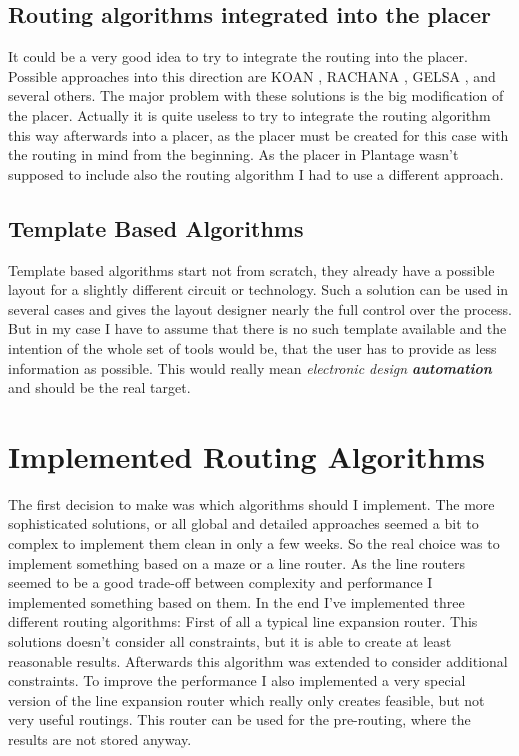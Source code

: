 \subsection{Routing algorithms integrated into the placer}
It could be a very good idea to try to integrate the routing into the placer. Possible approaches into this direction are KOAN \cite[page 178]{springer:eda_analog_routing}, RACHANA \cite[page 178]{springer:eda_analog_routing}, GELSA \cite[page 179]{springer:eda_analog_routing}, and several others. The major problem with these solutions is the big modification of the placer. Actually it is quite useless to try to integrate the routing algorithm this way afterwards into a placer, as the placer must be created for this case with the routing in mind from the beginning. As the placer in Plantage wasn't supposed to include also the routing algorithm I had to use a different approach.

\subsection{Template Based Algorithms}
Template based algorithms start not from scratch, they already have a possible layout for a slightly different circuit or technology. Such a solution can be used in several cases and gives the layout designer nearly the full control over the process. But in my case I have to assume that there is no such template available and the intention of the whole set of tools would be, that the user has to provide as less information as possible. This would really mean \textit{electronic design \textbf{automation}} and should be the real target.

\section{Implemented Routing Algorithms}
The first decision to make was which algorithms should I implement. The more sophisticated solutions, or all global and detailed approaches seemed a bit to complex to implement them clean in only a few weeks. So the real choice was to implement something based on a maze or a line router. As the line routers seemed to be a good trade-off between complexity and performance I implemented something based on them. In the end I've implemented three different routing algorithms: First of all a typical line expansion router. This solutions doesn't consider all constraints, but it is able to create at least reasonable results. Afterwards this algorithm was extended to consider additional constraints. To improve the performance I also implemented a very special version of the line expansion router which really only creates feasible, but not very useful routings. This router can be used for the pre-routing, where the results are not stored anyway.

